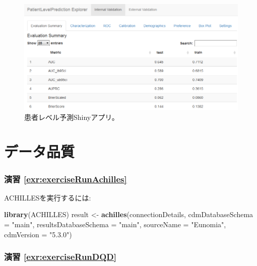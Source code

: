 \documentclass[
  11pt]{book}
\newenvironment{Shaded}{\begin{snugshade}}{\end{snugshade}}
\newcommand{\AttributeTok}[1]{\textcolor[rgb]{0.13,0.29,0.53}{#1}}
\newcommand{\FunctionTok}[1]{\textcolor[rgb]{0.13,0.29,0.53}{\textbf{#1}}}
\newcommand{\NormalTok}[1]{#1}
\newcommand{\OtherTok}[1]{\textcolor[rgb]{0.56,0.35,0.01}{#1}}
\newcommand{\StringTok}[1]{\textcolor[rgb]{0.31,0.60,0.02}{#1}}
\theoremstyle{definition}
\theoremstyle{definition}
\theoremstyle{definition}
\theoremstyle{definition}
\theoremstyle{remark}
\begin{document}
\begin{figure}

{\centering \includegraphics[width=1\linewidth]{images/SuggestedAnswers/plpShiny} 

}

\caption{患者レベル予測Shinyアプリ。}\label{fig:plpShiny}
\end{figure}

\section{データ品質}\label{DataQualityanswers}

\subsubsection*{演習 \ref{exr:exerciseRunAchilles}}\label{ux6f14ux7fd2-refexrexerciserunachilles}

ACHILLESを実行するには:

\begin{Shaded}
\begin{Highlighting}[]
\FunctionTok{library}\NormalTok{(ACHILLES)}
\NormalTok{result }\OtherTok{\textless{}{-}} \FunctionTok{achilles}\NormalTok{(connectionDetails,}
                   \AttributeTok{cdmDatabaseSchema =} \StringTok{"main"}\NormalTok{,}
                   \AttributeTok{resultsDatabaseSchema =} \StringTok{"main"}\NormalTok{,}
                   \AttributeTok{sourceName =} \StringTok{"Eunomia"}\NormalTok{,}
                   \AttributeTok{cdmVersion =} \StringTok{"5.3.0"}\NormalTok{)}
\end{Highlighting}
\end{Shaded}

\subsubsection*{演習 \ref{exr:exerciseRunDQD}}\label{ux6f14ux7fd2-refexrexerciserundqd}
\end{document}
